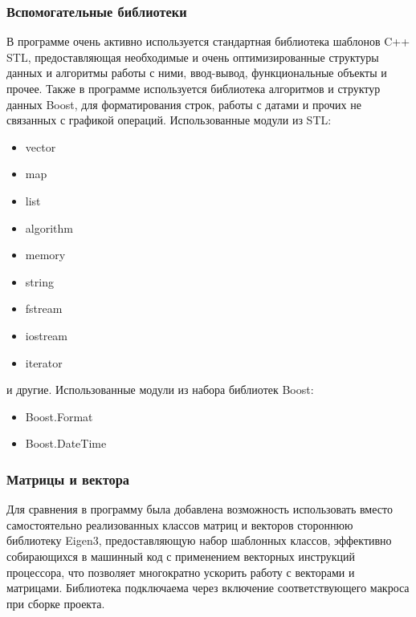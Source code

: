 \documentclass[a4paper,12pt]{report}
\begin{document}
\subsubsection{Вспомогательные библиотеки}
В программе очень активно используется стандартная библиотека шаблонов C++ STL, предоставляющая необходимые и очень оптимизированные структуры данных и алгоритмы работы с ними, ввод-вывод, функциональные объекты и прочее. Также в программе используется библиотека алгоритмов и структур данных Boost, для форматирования строк, работы с датами и прочих не связанных с графикой операций. Использованные модули из STL:
\begin{itemize}
\item vector
\item map
\item list
\item algorithm
\item memory
\item string
\item fstream
\item iostream
\item iterator
\end{itemize}
и другие. Использованные модули из набора библиотек Boost:
\begin{itemize}
\item Boost.Format
\item Boost.DateTime
\end{itemize}

\subsubsection{Матрицы и вектора}
Для сравнения в программу была добавлена возможность использовать вместо самостоятельно реализованных классов матриц и векторов стороннюю библиотеку Eigen3, предоставляющую набор шаблонных классов, эффективно собирающихся в машинный код с применением векторных инструкций процессора, что позволяет многократно ускорить работу с векторами и матрицами. Библиотека подключаема через включение соответствующего макроса при сборке проекта.
\end{document}
